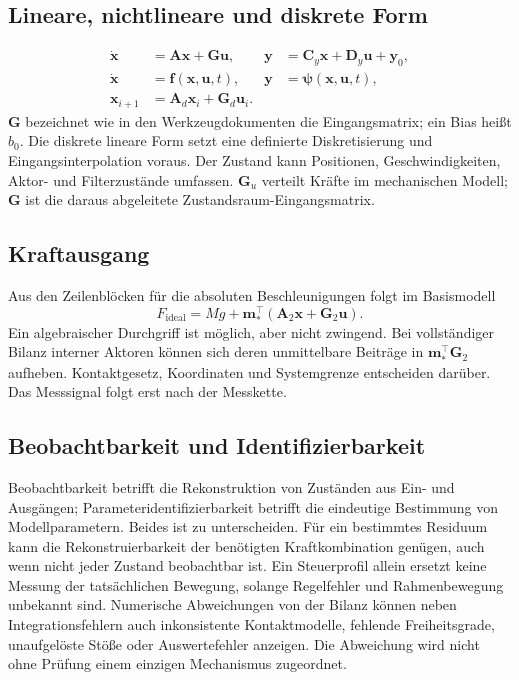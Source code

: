 \documentclass[11pt,a4paper]{article}
\begin{document}
\subsection{Lineare, nichtlineare und diskrete Form}
\begin{align}
\dot{\mathbf x}&=\mathbf A\mathbf x+\mathbf G\mathbf u, &
\mathbf y&=\mathbf C_y\mathbf x+\mathbf D_y\mathbf u+\mathbf y_0,\\
\dot{\mathbf x}&=\mathbf f(\mathbf x,\mathbf u,t), &
\mathbf y&=\boldsymbol\psi(\mathbf x,\mathbf u,t),\\
\mathbf x_{i+1}&=\mathbf A_d\mathbf x_i+\mathbf G_d\mathbf u_i.
\end{align}
$\mathbf G$ bezeichnet wie in den Werkzeugdokumenten die Eingangsmatrix; ein Bias heißt $b_0$. Die diskrete lineare Form setzt eine definierte Diskretisierung und Eingangsinterpolation voraus. Der Zustand kann Positionen, Geschwindigkeiten, Aktor- und Filterzustände umfassen. $\mathbf G_u$ verteilt Kräfte im mechanischen Modell; $\mathbf G$ ist die daraus abgeleitete Zustandsraum-Eingangsmatrix.

\subsection{Kraftausgang}
Aus den Zeilenblöcken für die absoluten Beschleunigungen folgt im Basismodell
\begin{equation}
F_{\mathrm{ideal}}=Mg+\mathbf m_*^\top(\mathbf A_2\mathbf x+\mathbf G_2\mathbf u).
\end{equation}
Ein algebraischer Durchgriff ist möglich, aber nicht zwingend. Bei vollständiger Bilanz interner Aktoren können sich deren unmittelbare Beiträge in $\mathbf m_*^\top\mathbf G_2$ aufheben. Kontaktgesetz, Koordinaten und Systemgrenze entscheiden darüber. Das Messsignal folgt erst nach der Messkette.

\subsection{Beobachtbarkeit und Identifizierbarkeit}
Beobachtbarkeit betrifft die Rekonstruktion von Zuständen aus Ein- und Ausgängen; Parameteridentifizierbarkeit betrifft die eindeutige Bestimmung von Modellparametern. Beides ist zu unterscheiden. Für ein bestimmtes Residuum kann die Rekonstruierbarkeit der benötigten Kraftkombination genügen, auch wenn nicht jeder Zustand beobachtbar ist. Ein Steuerprofil allein ersetzt keine Messung der tatsächlichen Bewegung, solange Regelfehler und Rahmenbewegung unbekannt sind.
Numerische Abweichungen von der Bilanz können neben Integrationsfehlern auch inkonsistente Kontaktmodelle, fehlende Freiheitsgrade, unaufgelöste Stöße oder Auswertefehler anzeigen. Die Abweichung wird nicht ohne Prüfung einem einzigen Mechanismus zugeordnet.
\end{document}
